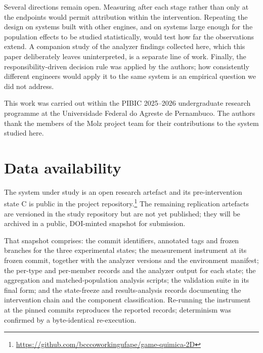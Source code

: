 \documentclass{sbc2019}%
\begin{document}
Several directions remain open. Measuring after each stage rather than only at
the endpoints would permit attribution within the intervention. Repeating the
design on systems built with other engines, and on systems large enough for the
population effects to be studied statistically, would test how far the
observations extend. A companion study of the analyzer findings collected here,
which this paper deliberately leaves uninterpreted, is a separate line of work.
Finally, the responsibility-driven decision rule was applied by the authors; how
consistently different engineers would apply it to the same system is an
empirical question we did not address.

\FloatBarrier

\begin{acknowledgements}
This work was carried out within the PIBIC 2025--2026 undergraduate research
programme at the Universidade Federal do Agreste de Pernambuco. The authors
thank the members of the Molz project team for their contributions to the
system studied here.
\end{acknowledgements}

\section*{Data availability}

The system under study is an open research artefact and its pre-intervention
state C is public in the project
repository.\footnote{\url{https://github.com/bcccoworkingufape/game-quimica-2D}}
The remaining replication artefacts are versioned in the study repository but
are not yet published; they will be archived in a public, DOI-minted snapshot
for submission.

That snapshot comprises: the commit identifiers, annotated tags and frozen
branches for the three experimental states; the measurement instrument at its frozen commit,
together with the analyzer versions and the environment manifest; the per-type
and per-member records and the analyzer output for each state; the aggregation
and matched-population analysis scripts; the validation suite in its final form;
and the state-freeze and results-analysis records documenting the intervention
chain and the component classification. Re-running the instrument at the pinned
commits reproduces the reported records; determinism was confirmed by a
byte-identical re-execution.
\end{document}
